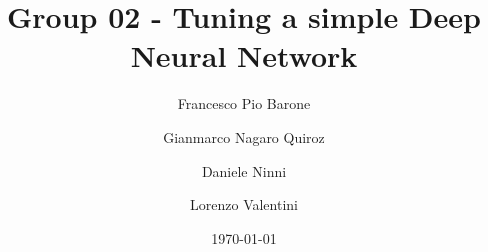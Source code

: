 \documentclass[twocolumn]{revtex4-1}  %
\begin{document}
\title{Group 02 - Tuning a simple Deep Neural Network}

\author{Francesco Pio Barone}
\author{Gianmarco Nagaro Quiroz}
\author{Daniele Ninni}
\author{Lorenzo Valentini}

\date{\today}

\begin{abstract}

\end{abstract}

\maketitle














\clearpage
\end{document}
